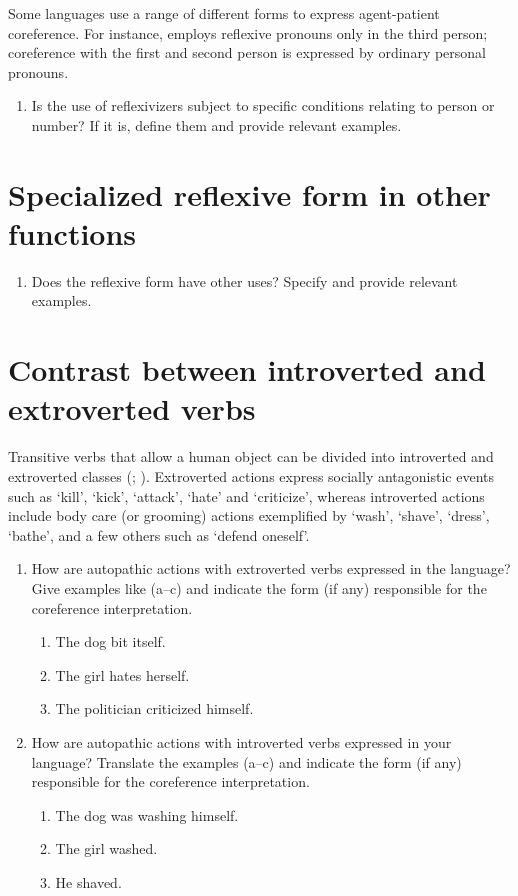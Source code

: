 \documentclass[output=paper]{langscibook}
\begin{document}
Some languages use a range of different forms to express agent-patient coreference. For instance,  employs reflexive pronouns only in the third person; coreference with the first and second person is expressed by ordinary personal pronouns.

\begin{enumerate}[resume]
\item Is the use of reflexivizers subject to specific conditions relating to person or number? If it is, define them and provide relevant examples. 

\end{enumerate}
\section*{Specialized reflexive form in other functions}
\begin{enumerate}[resume]
\item
Does the reflexive form have other uses? Specify and provide relevant examples. 

\end{enumerate}
\section*{Contrast between introverted and extroverted verbs}

Transitive verbs that allow a human object can be divided into introverted and extroverted classes 
(\citealt[803]{Haiman1980}; \citealt[61]{KoenigSiemund1999}). Extroverted actions express socially antagonistic events such as ‘kill’, ‘kick’, ‘attack’, ‘hate’ and ‘criticize’, whereas introverted actions include body care (or grooming) actions exemplified by ‘wash’, ‘shave’, ‘dress’, ‘bathe’, and a few others such as ‘defend oneself’.


\begin{enumerate}[resume]
\item
How are autopathic actions with extroverted verbs expressed in the language? Give examples like (a--c) and indicate the form (if any) responsible for the coreference interpretation. 

\begin{enumerate}[label=\alph*.]
\item The dog bit itself. 
\item The girl hates herself. 
\item The politician criticized himself. 
\end{enumerate}

\item
How are autopathic actions with introverted verbs expressed in your language? Translate the examples (a--c) and indicate the form (if any) responsible for the coreference interpretation. 
\begin{enumerate}[label=\alph*.]
\item The dog was washing himself. 
\item The girl washed. 
\item He shaved. 
\end{enumerate}
\end{enumerate}
\end{document}
